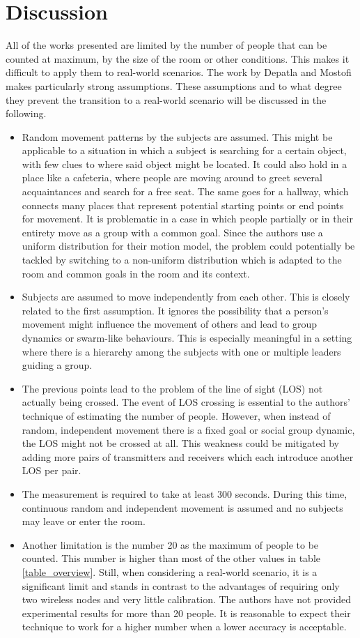 \documentclass[conference]{IEEEtran}
\begin{document}
\section{Discussion}
All of the works presented are limited by the number of people that can be counted at maximum, by the size of the room or other conditions. This makes it difficult to apply them to real-world scenarios. The work by Depatla and Mostofi \cite{DepatlaMostofi} makes particularly strong assumptions. These assumptions and to what degree they prevent the transition to a real-world scenario will be discussed in the following.
\begin{itemize}
\item Random movement patterns by the subjects are assumed. This might be applicable to a situation in which a subject is searching for a certain object, with few clues to where said object might be located. It could also hold in a place like a cafeteria, where people are moving around to greet several acquaintances and search for a free seat. The same goes for a hallway, which connects many places that represent potential starting points or end points for movement. It is problematic in a case in which people partially or in their entirety move as a group with a common goal. Since the authors use a uniform distribution for their motion model, the problem could potentially be tackled by switching to a non-uniform distribution which is adapted to the room and common goals in the room and its context.
\item Subjects are assumed to move independently from each other. This is closely related to the first assumption. It ignores the possibility that a person's movement might influence the movement of others and lead to group dynamics or swarm-like behaviours. This is especially meaningful in a setting where there is a hierarchy among the subjects with one or multiple leaders guiding a group.
\item The previous points lead to the problem of the line of sight (LOS) not actually being crossed. The event of LOS crossing is essential to the authors' technique of estimating the number of people. However, when instead of random, independent movement there is a fixed goal or social group dynamic, the LOS might not be crossed at all. This weakness could be mitigated by adding more pairs of transmitters and receivers which each introduce another LOS per pair.
\item The measurement is required to take at least 300 seconds. During this time, continuous random and independent movement is assumed and no subjects may leave or enter the room. 
\item Another limitation is the number 20 as the maximum of people to be counted. This number is higher than most of the other values in table \ref{table_overview}. Still, when considering a real-world scenario, it is a significant limit and stands in contrast to the advantages of requiring only two wireless nodes and very little calibration. The authors have not provided experimental results for more than 20 people. It is reasonable to expect their technique to work for a higher number when a lower accuracy is acceptable. 
\end{itemize}
\end{document}
